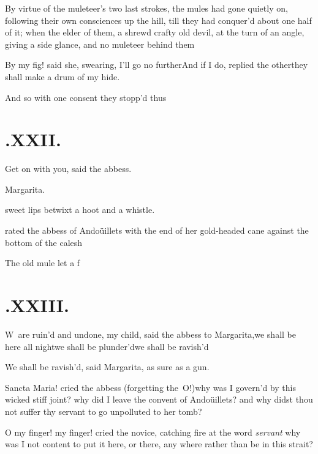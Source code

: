 \documentclass{article}
\begin{document}
By virtue of the muleteer’s two last strokes, the mules had
gone quietly on, following their own consciences up the hill, till
they had conquer’d about one half of it; when the elder of
them, a shrewd crafty old devil, at the turn of an angle, giving a
side glance, and no muleteer behind them\tsh

By my fig! said she, swearing, I’ll go\break
no further\tsh And if I do, replied the\break
other\tsk they shall make a drum of my\break
hide.\tsh

And so with one consent they stopp’d thus\tsh

\vfill{}\eject
\section{.\enspace XXII.}

\quad\tsh Get on with you, said the abbess.

\noindent
{}\break
Margarita.

\noindent
{}

\noindent
{}\break
{}
sweet lips betwixt a hoot and a whistle.

\noindent
{}\break
rated the abbess of Andoüillets with the end of her gold-headed
cane against the bottom of the calesh\tsh

\tsh The old mule let a f\tsk

\vfill{}\eject
\section{.\enspace XXIII.}

\lettrine{W}{\,} are ruin’d and undone, my\break
child, said the abbess to Margarita,\tsh we shall
be here all night\tsh we shall be
plunder’d\tsh we shall be ravish’d\tsh

\tsh We shall be ravish’d, said Margarita,
as sure as a gun.

Sancta Maria! cried the abbess (forgetting the~O!)\tsk why was I govern’d by this
wicked stiff joint? why did I leave the convent of
Andoüillets? and why didst thou not suffer thy servant
to go unpolluted to her tomb?

O my finger! my finger! cried the novice, catching fire at the
word \textit{servant}
\tsk why was I not content to put it here, or
there, any where rather than be in this strait?
\end{document}
